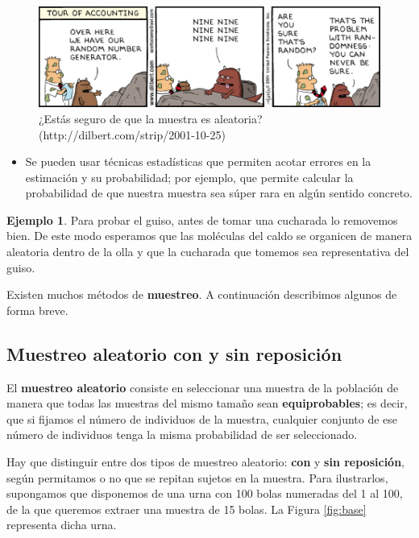 \documentclass[
]{book}
\providecommand{\tightlist}{%
  \setlength{\itemsep}{0pt}\setlength{\parskip}{0pt}}
\theoremstyle{definition}
\theoremstyle{definition}
\newtheorem{example}{Ejemplo}[chapter]
\theoremstyle{definition}
\theoremstyle{definition}
\theoremstyle{remark}
\begin{document}
\begin{figure}

{\centering \includegraphics[width=0.8\linewidth]{INREMDN_files/figure-html/randomgen} 

}

\caption{¿Estás seguro de que la muestra es aleatoria? (http://dilbert.com/strip/2001-10-25)}\label{fig:unnamed-chunk-63}
\end{figure}

\begin{itemize}
\tightlist
\item
  Se pueden usar técnicas estadísticas que permiten acotar errores en la estimación y su probabilidad; por ejemplo, que permite calcular la probabilidad de que nuestra muestra sea súper rara en algún sentido concreto.
\end{itemize}

\begin{example}
\protect\hypertarget{exm:unnamed-chunk-64}{}\label{exm:unnamed-chunk-64}Para probar el guiso, antes de tomar una cucharada lo removemos bien. De este modo esperamos que las moléculas del caldo se organicen de manera aleatoria dentro de la olla y que la cucharada que tomemos sea representativa del guiso.
\end{example}

Existen muchos métodos de \textbf{muestreo}. A continuación describimos algunos de forma breve.

\hypertarget{sec:mas}{%
\subsection{Muestreo aleatorio con y sin reposición}\label{sec:mas}}

El \textbf{muestreo aleatorio} consiste en seleccionar una muestra de la población de manera que todas las muestras del mismo tamaño sean \textbf{equiprobables}; es decir, que si fijamos el número de individuos de la muestra, cualquier conjunto de ese número de individuos tenga la misma probabilidad de ser seleccionado.

Hay que distinguir entre dos tipos de muestreo aleatorio: \textbf{con} y \textbf{sin reposición}, según permitamos o no que se repitan sujetos en la muestra. Para ilustrarlos, supongamos que disponemos de una urna con 100 bolas numeradas del 1 al 100, de la que queremos extraer una muestra de 15 bolas. La Figura \ref{fig:base} representa dicha urna.
\end{document}
